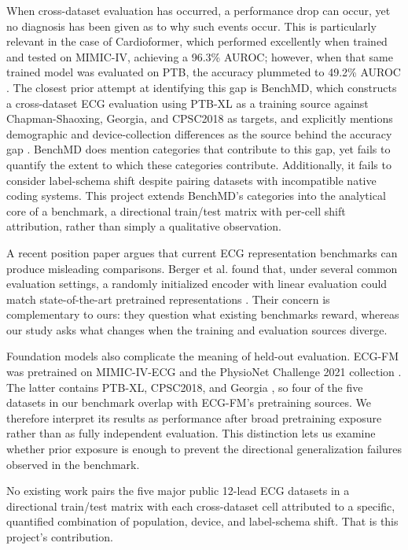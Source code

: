 \documentclass[conference]{IEEEtran}
\begin{document}
When cross-dataset evaluation has occurred, a performance drop can occur, yet no diagnosis has been given as to why such events occur. This is particularly relevant in the case of Cardioformer, which performed excellently when trained and tested on MIMIC-IV, achieving a 96.3\% AUROC; however, when that same trained model was evaluated on PTB, the accuracy plummeted to 49.2\% AUROC \cite{mobin2025}. The closest prior attempt at identifying this gap is BenchMD, which constructs a cross-dataset ECG evaluation using PTB-XL as a training source against Chapman-Shaoxing, Georgia, and CPSC2018 as targets, and explicitly mentions demographic and device-collection differences as the source behind the accuracy gap \cite{wantlin2023}. BenchMD does mention categories that contribute to this gap, yet fails to quantify the extent to which these categories contribute. Additionally, it fails to consider label-schema shift despite pairing datasets with incompatible native coding systems. This project extends BenchMD's categories into the analytical core of a benchmark, a directional train/test matrix with per-cell shift attribution, rather than simply a qualitative observation.

A recent position paper argues that current ECG representation benchmarks can produce misleading comparisons. Berger et al. found that, under several common evaluation settings, a randomly initialized encoder with linear evaluation could match state-of-the-art pretrained representations \cite{berger2026}. Their concern is complementary to ours: they question what existing benchmarks reward, whereas our study asks what changes when the training and evaluation sources diverge.

Foundation models also complicate the meaning of held-out evaluation. ECG-FM was pretrained on MIMIC-IV-ECG and the PhysioNet Challenge 2021 collection \cite{mckeen2025}. The latter contains PTB-XL, CPSC2018, and Georgia \cite{reyna2021}, so four of the five datasets in our benchmark overlap with ECG-FM's pretraining sources. We therefore interpret its results as performance after broad pretraining exposure rather than as fully independent evaluation. This distinction lets us examine whether prior exposure is enough to prevent the directional generalization failures observed in the benchmark.

No existing work pairs the five major public 12-lead ECG datasets in a directional train/test matrix with each cross-dataset cell attributed to a specific, quantified combination of population, device, and label-schema shift. That is this project's contribution.
\end{document}
